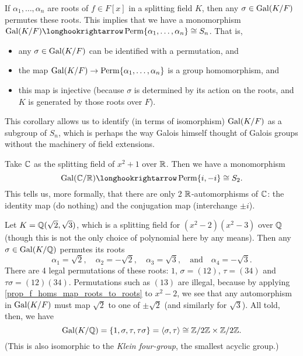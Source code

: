 \begin{corollary}
    If $\alpha_1, \ldots, \alpha_n$ are roots of $f \in F[x]$ in a splitting field $K$, then any $\sigma \in \operatorname{Gal}(K/F)$ permutes these roots. This implies that we have a monomorphism $\gal(K/F) \inclusion \perm \{\alpha_1, \ldots, \alpha_n\} \cong S_n$. That is,
    \begin{itemize}
        \item any $\sigma \in \operatorname{Gal}(K/F)$ can be identified with a permutation, and
        \item the map $\operatorname{Gal}(K/F) \to \operatorname{Perm} \{\alpha_1, \ldots, \alpha_n\}$ is a group homomorphism, and
        \item this map is injective (because $\sigma$ is determined by its action on the roots, and $K$ is generated by those roots over $F$).
    \end{itemize}
\end{corollary}

This corollary allows us to identify (in terms of isomorphism) $\operatorname{Gal}(K/F)$ as a subgroup of $S_n$, which is perhaps the way Galois himself thought of Galois groups without the machinery of field extensions.

\begin{example}
    Take $\mathbb{{C}}$ as the splitting field of $x^2 + 1$ over $\mathbb{{R}}$. Then we have a monomorphism
    \[
        \gal(\bb{C}/\bb{R}) \inclusion \perm\{i, -i\} \cong S_2.
    \]
    This tells us, more formally, that there are only 2 $\mathbb{{R}}$-automorphisms of $\mathbb{{C}}$: the identity map (do nothing) and the conjugation map (interchange $\pm i$).
\end{example}

\begin{example}
\label{exmp_gal_grp_of_biquadratic_ext}
    Let $K = \mathbb{{Q}}(\sqrt{2}, \sqrt{3})$, which is a splitting field for $(x^2 - 2)(x^2 - 3)$ over $\mathbb{{Q}}$ (though this is not the only choice of polynomial here by any means). Then any $\sigma \in \operatorname{Gal}(K/\mathbb{{Q}})$ permutes its roots
    \[
        \alpha_1 = \sqrt{2},
        \quad
        \alpha_2 = -\sqrt{2},
        \quad
        \alpha_3 = \sqrt{3},
        \quad \text{and} \quad
        \alpha_4 = -\sqrt{3}.
    \]
    There are 4 legal permutations of these roots: $1$, $\sigma = (12)$, $\tau = (34)$ and $\tau \sigma = (12)(34)$. Permutations such as $(13)$ are illegal, because by applying \cref{prop_f_homs_map_roots_to_roots} to $x^2 - 2$, we see that any automorphism in $\operatorname{Gal}(K/F)$ must map $\sqrt{2}$ to one of $\pm \sqrt{2}$ (and similarly for $\sqrt{3}$). All told, then, we have
    \[
        \operatorname{Gal}(K/\mathbb{{Q}}) = \{1, \sigma, \tau, \tau \sigma\} = \langle {\sigma, \tau} \rangle \cong \mathbb{{Z}}/{{2}}\mathbb{{Z}} \times \mathbb{{Z}}/{{2}}\mathbb{{Z}}.
    \]
    (This is also isomorphic to the \emph{Klein four-group}, the smallest acyclic group.)
\end{example}

